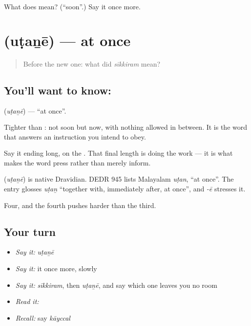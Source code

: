 \begin{tcolorbox}[breakable,colback=teal!4,colframe=teal!35!black,title={Before you move on}]
What does  mean? (\textquotedblleft{}soon\textquotedblright{}.) Say it once more.
\end{tcolorbox}
\section[\texorpdfstring{\ta{உடனே} (uṭaṉē)}{உடனே (uṭaṉē)}]{ (uṭaṉē) — at once}

\label{lesson:TA-C62-at-once}



\begin{quote}
Before the new one: what did \emph{sīkkiram} mean?
\end{quote}

\subsection*{You'll want to know: }
\textbf{} (\emph{uṭaṉē}) — \textquotedblleft{}at once\textquotedblright{}.

Tighter than : not soon but now, with nothing allowed in between. It is the word that answers an instruction you intend to obey.

Say it ending long, on the . That final length is doing the work — it is what makes the word press rather than merely inform.

\begin{cousinweb}
\textbf{} (\emph{uṭaṉē}) is native Dravidian. DEDR 945 lists Malayalam \emph{uṭan}, \textquotedblleft{}at once\textquotedblright{}. The entry glosses \emph{uṭaṉ} \textquotedblleft{}together with, immediately after, at once\textquotedblright{}, and \emph{-ē} stresses it.
\end{cousinweb}

\begin{grammarlens}[title={What you've built}]
Four, and the fourth pushes harder than the third.
\end{grammarlens}

\subsection*{Your turn}
\begin{itemize}
\raggedright
  \item \emph{Say it:} \emph{uṭaṉē}
  \item \emph{Say it:} it once more, slowly
  \item \emph{Say it:} \emph{sīkkiram}, then \emph{uṭaṉē}, and say which one leaves you no room
  \item \emph{Read it:} \textbf{}
  \item \emph{Recall:} say \emph{kāyccal}
\end{itemize}

